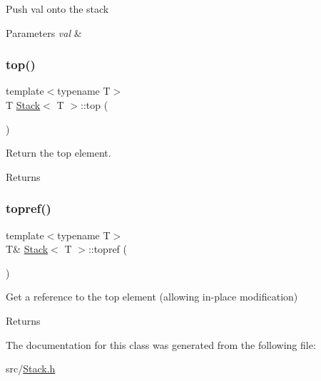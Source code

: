 Push val onto the stack 
\begin{DoxyParams}{Parameters}
{\em val} & \\
\hline
\end{DoxyParams}
\mbox{\label{class_stack_ad461f6de40c8672dbf743068f4515061}} 
\subsubsection{\texorpdfstring{top()}{top()}}
{\footnotesize\ttfamily template$<$typename T$>$ \\
T \hyperlink{class_stack}{Stack}$<$ T $>$\+::top (\begin{DoxyParamCaption}{ }\end{DoxyParamCaption})\hspace{0.3cm}{\ttfamily [inline]}}

Return the top element. \begin{DoxyReturn}{Returns}

\end{DoxyReturn}
\mbox{\label{class_stack_a318da5613921ddf481a21c62ce006c3c}} 
\subsubsection{\texorpdfstring{topref()}{topref()}}
{\footnotesize\ttfamily template$<$typename T$>$ \\
T\& \hyperlink{class_stack}{Stack}$<$ T $>$\+::topref (\begin{DoxyParamCaption}{ }\end{DoxyParamCaption})\hspace{0.3cm}{\ttfamily [inline]}}

Get a reference to the top element (allowing in-\/place modification) \begin{DoxyReturn}{Returns}

\end{DoxyReturn}


The documentation for this class was generated from the following file\+:\begin{DoxyCompactItemize}
\item 
src/\hyperlink{_stack_8h}{Stack.\+h}\end{DoxyCompactItemize}
